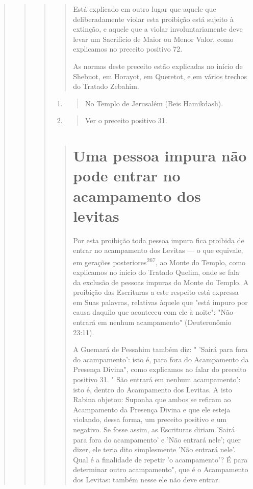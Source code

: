 \begin{quote}
\begin{quote}
\begin{quote}
\begin{quote}
Está explicado em outro lugar que aquele que deliberadamente vio­lar
esta proibição está sujeito à extinção, e aquele que a violar
involuntariamen­te deve levar um Sacrifício de Maior ou Menor Valor,
como explicamos no pre­ceito positivo 72.

As normas deste preceito estão explicadas no início de Shebuot, em
Horayot, em Queretot, e em vários trechos do Tratado Zebahim.
\end{quote}

\begin{enumerate}
\def\labelenumi{\arabic{enumi}.}
\setcounter{enumi}{264}
\item
 \begin{quote}
 No Templo de Jerusalém (Beis Hamikdash).
 \end{quote}
\item
 \begin{quote}
 Ver o preceito positivo 31.
 \end{quote}
\end{enumerate}

\begin{quote}

\section{Uma pessoa impura não pode entrar no acampamento dos levitas}

Por esta proibição toda pessoa impura fica proibida de entrar no
acampamento dos Levitas --- o que equivale, em gerações
posteriores\textsuperscript{267}, ao Monte do Templo, como explicamos no
início do Tratado Quelim, onde se fa­la da exclusão de pessoas impuras
do Monte do Templo. A proibição das Escri­turas a este respeito está
expressa em Suas palavras, relativas àquele que "está impuro por causa
daquilo que aconteceu com ele à noite": "Não entrará em nenhum
acampamento" (Deuteronômio 23:11).

A Guemará de Pessahim também diz: " 'Sairá para fora do acampa­mento':
isto é, para fora do Acampamento da Presença Divina", como explica­mos
ao falar do preceito positivo 31. " São entrará em nenhum acampamen­to':
isto é, dentro do Acampamento dos Levitas. A isto Rabina objetou:
Supo­nha que ambos se refiram ao Acampamento da Presença Divina e que
ele esteja violando, dessa forma, um preceito positivo e um negativo. Se
fosse assim, as Escrituras diriam 'Sairá para fora do acampamento' e
'Não entrará nele'; quer dizer, ele teria dito simplesmente 'Não entrará
nele'. Qual é a finalidade de re­petir 'o acampamento'? É para
determinar outro acampamento", que é o Acam­pamento dos Levitas: também
nesse ele não deve entrar.


\end{quote}
\end{quote}
\end{quote}
\end{quote}
